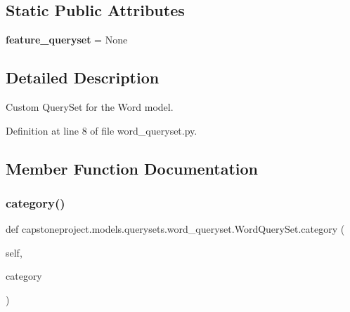 \subsection*{Static Public Attributes}
\begin{DoxyCompactItemize}
\item 
\mbox{\label{classcapstoneproject_1_1models_1_1querysets_1_1word__queryset_1_1_word_query_set_a50dc69dfefce82b4d93b0269a66d19f3}} 
{\bfseries feature\+\_\+queryset} = None
\end{DoxyCompactItemize}


\subsection{Detailed Description}
\begin{DoxyVerb}Custom QuerySet for the Word model.
\end{DoxyVerb}
 

Definition at line 8 of file word\+\_\+queryset.\+py.



\subsection{Member Function Documentation}
\mbox{\label{classcapstoneproject_1_1models_1_1querysets_1_1word__queryset_1_1_word_query_set_a2ef3ee38bf66a89886b7e20144758321}} 
\subsubsection{\texorpdfstring{category()}{category()}}
{\footnotesize\ttfamily def capstoneproject.\+models.\+querysets.\+word\+\_\+queryset.\+Word\+Query\+Set.\+category (\begin{DoxyParamCaption}\item[{}]{self,  }\item[{}]{category }\end{DoxyParamCaption})}

